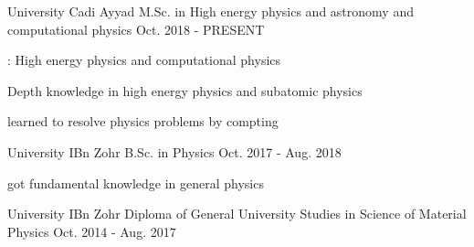 

\begin{cventries}

  \cventry
    {University Cadi Ayyad} %
        {M.Sc. in High energy physics and astronomy and computational physics } %
    {} %
    {Oct. 2018 - PRESENT} %
    {
      \begin{cvitems} %
        \item { :  High energy physics and computational physics}
        \item {Depth knowledge in high energy physics and subatomic physics}
        \item {learned  to resolve physics problems by compting }
      \end{cvitems}
    }

      \cventry
    {University IBn Zohr} %
        {B.Sc. in Physics} %
    {} %
    {Oct. 2017 - Aug. 2018} %
    {
      \begin{cvitems} %
        \item {got fundamental knowledge in general  physics}
      \end{cvitems}
    }

          \cventry
    {University IBn Zohr} %
        {Diploma of General University Studies in Science of Material Physics} %
    {} %
    {Oct. 2014 - Aug. 2017} %
    {
    }
    

\end{cventries}
